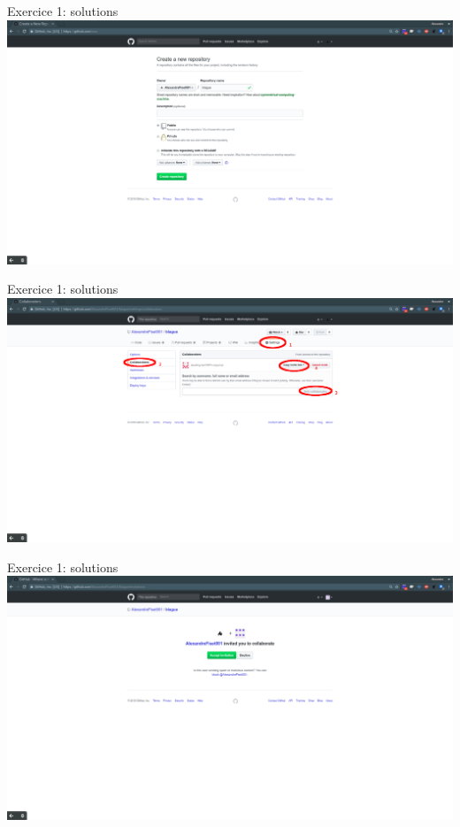 \documentclass{beamer}
\begin{document}
\begin{frame}{Exercice 1: solutions}
    \centering
    \includegraphics[width=\textwidth]{img/image_exercices/repo_config.png}
\end{frame}

\begin{frame}{Exercice 1: solutions}
    \centering
    \includegraphics[width=\textwidth]{img/image_exercices/add_collab.png}
\end{frame}

\begin{frame}{Exercice 1: solutions}
    \centering
    \includegraphics[width=\textwidth]{img/image_exercices/accept_invitation.png}
\end{frame}
\end{document}
